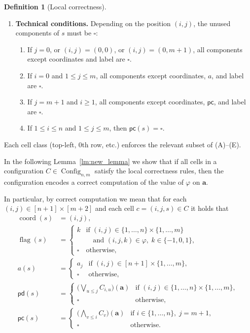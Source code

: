 \documentclass{article}
\theoremstyle{plain}
\theoremstyle{definition}
\newtheorem{definition}[theorem]{Definition}
\DeclareMathOperator{\Config}{Config}
\DeclareMathOperator{\flag}{flag}
\DeclareMathOperator{\coord}{coord}
\newcommand{\pc}{\mathsf{pc}}
\newcommand{\pd}{\mathsf{pd}}
\newcommand{\tuple}{\mathbf}
\begin{document}
\begin{definition}[Local correctness]
\begin{enumerate}[label=(\Alph*)]
\item \textbf{Technical conditions.}
Depending on the position $(i,j)$, the unused components of $s$
must be $\square$:
\begin{enumerate}[label=(E\arabic*)]
\item If $j=0$, or $(i,j)=(0,0)$, or $(i,j)=(0,m+1)$,
all components except coordinates and label are $\square$.
\item If $i=0$ and $1\le j\le m$, all components except
coordinates, $a$, and label are $\square$.
\item If $j=m+1$ and $i\ge 1$, all components except
coordinates, $\pc$, and label are $\square$.
\item If $1\le i\le n$ and $1\le j\le m$, then $\pc(s)=\square$.
\end{enumerate}

\end{enumerate}

Each cell class (top-left, $0$th row, etc.) enforces the relevant subset of
(A)--(E).
\end{definition}





In the following Lemma~\ref{lm:new_lemma} we show that if all cells in a configuration $C \in \Config_{n,m}$
satisfy the local correctness rules, then the configuration encodes a correct
computation of the value of $\varphi$ on $\tuple a$. 

In particular, by correct computation we mean that for each 
$(i,j) \in [n+1] \times [m+2]$ and each cell $c=(i,j,s)\in C$ it holds that
\begin{align}\label{eq: definition_table}
\coord(s) &= (i,j), \nonumber\\[6pt] 
\flag(s) &=
\begin{cases} \nonumber
k
& \text{if } (i,j)\in \{1,\dots,n\}\times\{1,\dots,m\} \\
& \quad \text{and } (i,j,k)\in \varphi,\; k\in\{-1,0,1\}, \\[6pt]
\square
& \text{otherwise,}
\end{cases} \\[10pt]
a(s) &=
\begin{cases} \nonumber
a_j
& \text{if } (i,j)\in [n+1]\times\{1,\dots,m\}, \\[6pt]
\square
& \text{otherwise,}
\end{cases} \\[10pt]
\pd(s) &=
\begin{cases} \nonumber
\bigl(\bigvee_{u\le j} C_{i,u}\bigr)(\tuple a)
& \text{if } (i,j)\in \{1,\dots,n\}\times\{1,\dots,m\}, \\[6pt]
\square
& \text{otherwise,}
\end{cases} \\[10pt]
\pc(s) &=
\begin{cases}
\bigl(\bigwedge_{v\le i} C_v\bigr)(\tuple a)
& \text{if } i\in \{1,\dots,n\},\; j=m+1, \\[6pt]
\square
& \text{otherwise.}
\end{cases}
\end{align}
\end{document}
